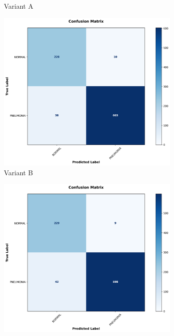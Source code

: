 \documentclass[preprint,12pt]{elsarticle}
\begin{document}
\begin{figure}[!t]
\begin{subfigure}[b]{0.24\columnwidth}
\caption{Variant A}
\label{fig:confusion_intermediate1_chest}
\end{subfigure}
\hfill
\begin{subfigure}[b]{0.24\columnwidth}
\centering
\includegraphics[width=\columnwidth]{fig/cm/chest_xray/no_afd_mfe.png}
\caption{Variant B}
\label{fig:confusion_intermediate2_chest}
\end{subfigure}
\hfill
\begin{subfigure}[b]{0.24\columnwidth}
\centering
\includegraphics[width=\columnwidth]{fig/cm/chest_xray/no_afd.png}

\end{subfigure}
\end{figure}
\end{document}
